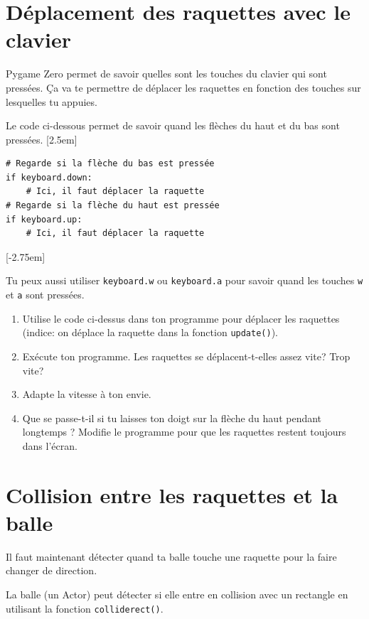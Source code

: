 \documentclass[11pt]{article}
\begin{document}
\section{Déplacement des raquettes avec le clavier}

Pygame Zero permet de savoir quelles sont les touches du clavier qui sont pressées.
Ça va te permettre de déplacer les raquettes en fonction des touches sur lesquelles tu appuies.

Le code ci-dessous permet de savoir quand les flèches du haut et du bas sont pressées.
\marginnote{\textcolor{deepblue}{keyboard~=~clavier\\down~=~bas}}[2.5em]

\begin{lstlisting}
# Regarde si la flèche du bas est pressée
if keyboard.down:
    # Ici, il faut déplacer la raquette
# Regarde si la flèche du haut est pressée
if keyboard.up:
    # Ici, il faut déplacer la raquette
\end{lstlisting}
\marginnote{\textcolor{deepblue}{up~=~haut}}[-2.75em]

Tu peux aussi utiliser \lstinline{keyboard.w} ou \lstinline{keyboard.a} pour savoir quand les touches \texttt{w} et \texttt{a} sont pressées.

\begin{enumerate}
    \item Utilise le code ci-dessus dans ton programme pour déplacer les raquettes (indice: on déplace la raquette dans la fonction \texttt{update()}).
    \item Exécute ton programme. Les raquettes se déplacent-t-elles assez vite? Trop vite?
    \item Adapte la vitesse à ton envie.
    \item Que se passe-t-il si tu laisses ton doigt sur la flèche du haut pendant longtemps ? Modifie le programme pour que les raquettes restent toujours dans l'écran.
\end{enumerate}

\section{Collision entre les raquettes et la balle}

Il faut maintenant détecter quand ta balle touche une raquette pour la faire changer de direction.

La balle (un Actor) peut détecter si elle entre en collision avec un rectangle en utilisant la fonction \lstinline{colliderect()}.
\end{document}
